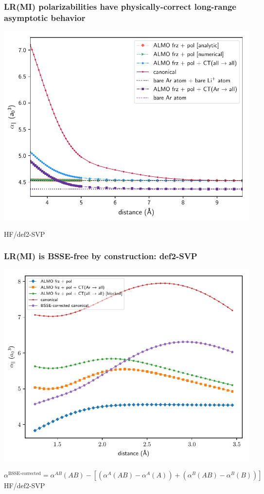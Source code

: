 \documentclass[%
    xcolor=usenames,dvipsnames,svgnames%
]{beamer}
\newenvironment{nscenter}
 {\parskip=0pt\par\nopagebreak\centering}
 {\par\noindent\ignorespacesafterend}
\begin{document}
\begin{frame}
  \frametitle{LR(MI) polarizabilities have physically-correct long-range asymptotic behavior}
  \begin{nscenter}
    \includegraphics[scale=0.65]{./figures/long_convergence_behavior_onaxis_def2-SVP.pdf}
  \end{nscenter}
  {\tiny HF/def2-SVP}
\end{frame}

\begin{frame}
  \frametitle{LR(MI) is BSSE-free by construction: def2-SVP}
  \begin{nscenter}
    \includegraphics[scale=0.50]{./figures/almo_vs_bsse_canonical_onaxis_projected_short_def2-SVP.pdf}
  \end{nscenter}
  \scriptsize
  \begin{equation*}
    \alpha^{\text{BSSE-corrected}} = \alpha^{AB}(AB) - \left[ \left( \alpha^{A}(AB) - \alpha^{A}(A) \right) + \left( \alpha^{B}(AB) - \alpha^{B}(B) \right) \right]
  \end{equation*}
  HF/def2-SVP
\end{frame}
\end{document}
